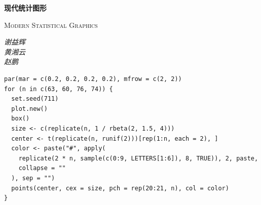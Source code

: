 \documentclass[UTF8]{ctexart}
\begin{document}
\begin{titlepage}


  \centering
	{\scshape\Huge\bf 现代统计图形 \par}
  {\scshape\huge Modern Statistical Graphics\par}
  \vspace*{\baselineskip}
  \vfill
	{\LARGE\itshape 
	谢益辉\\
	黄湘云\\
  赵鹏
\par
}
\vspace*{\baselineskip}
\vfill
\begin{lstlisting}
par(mar = c(0.2, 0.2, 0.2, 0.2), mfrow = c(2, 2))
for (n in c(63, 60, 76, 74)) {
  set.seed(711)
  plot.new()
  box()
  size <- c(replicate(n, 1 / rbeta(2, 1.5, 4)))
  center <- t(replicate(n, runif(2)))[rep(1:n, each = 2), ]
  color <- paste("#", apply(
    replicate(2 * n, sample(c(0:9, LETTERS[1:6]), 8, TRUE)), 2, paste,
    collapse = ""
  ), sep = "")
  points(center, cex = size, pch = rep(20:21, n), col = color)
}
\end{lstlisting}
\vspace*{\baselineskip}
\vfill


\end{titlepage}
\end{document}
